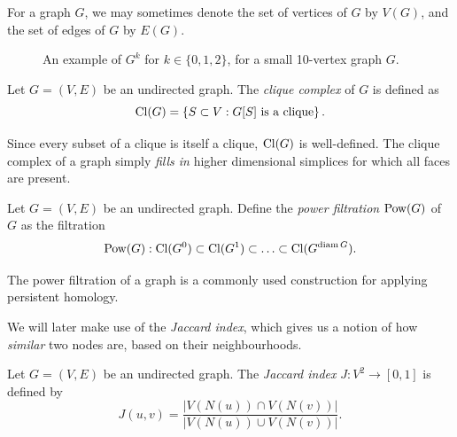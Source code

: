 For a graph $G$, we may sometimes denote the set of vertices of $G$ by $V(G)$, and the set of edges of $G$ by $E(G)$. 

\begin{figure}
    \caption{An example of $G^k$ for $k \in \{0,1,2\}$, for a small 10-vertex graph $G$.}
    \label{fig:power-graph}
  \end{figure}

\begin{definition}
    Let $G = (V,E)$ be an undirected graph. The \emph{clique complex} of $G$ is defined as
    \[ \operatorname{Cl}(G) = \left\{ S \subset V: \text{$G[S]$ is a clique} \right\}. \]
\end{definition}

Since every subset of a clique is itself a clique, $\operatorname{Cl}(G)$ is well-defined. The clique complex of a graph simply \emph{fills in} higher dimensional simplices for which all faces are present.

\begin{definition}
    Let $G = (V,E)$ be an undirected graph. Define the \emph{power filtration} $\operatorname{Pow}(G)$ of $G$ as the filtration
    \[ \operatorname{Pow}(G): \operatorname{Cl}(G^0) \subset \operatorname{Cl}(G^1) \subset \ldots \subset \operatorname{Cl}(G^{\operatorname{diam} G}). \]
\end{definition}

The power filtration of a graph is a commonly used construction for applying persistent homology.

We will later make use of the \emph{Jaccard index}, which gives us a notion of how \emph{similar} two nodes are, based on their neighbourhoods. 

\begin{definition}
    Let $G = (V,E)$ be an undirected graph. The \emph{Jaccard index} $J: V^2 \to [0,1]$ is defined by
    \[ J(u,v) = \frac{\lvert V(N(u)) \cap V(N(v)) \rvert}{\lvert V(N(u)) \cup V(N(v)) \rvert}. \]
\end{definition}

